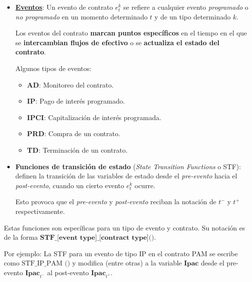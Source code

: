 \documentclass{beamer}
\begin{document}
\begin{frame}
    \begin{itemize}
        \item \textbf{\underline{Eventos}}: Un evento de contrato $e_t^k$ se refiere a cualquier evento \textit{programado} o \textit{no programado} en un momento determinado $t$ y de un tipo determinado $k$. 
        \vfill

        Los eventos del contrato \textbf{marcan puntos específicos} en el tiempo en el que se \textbf{intercambian flujos de efectivo} o se \textbf{actualiza el estado del contrato}. 

        \vfill
        \pause

        Algunos tipos de eventos:

        \begin{itemize}
            \item \textbf{AD}: Monitoreo del contrato.
            \item \textbf{IP}: Pago de interés programado.
            \item \textbf{IPCI}: Capitalización de interés programada.
            \item \textbf{PRD}: Compra de un contrato.
            \item \textbf{TD}: Terminación de un contrato.

        \end{itemize}
    \end{itemize}
\end{frame}

\begin{frame}
    \begin{itemize}
        \item \textbf{Funciones de transición de estado} (\textit{State Transition Functions} o STF): definen la transición de las variables de estado desde el \textit{pre-evento} hacia el \textit{post-evento}, cuando un cierto evento $e^k_t$ ocurre. 

            Esto provoca que el \textit{pre-evento} y \textit{post-evento} reciban la notación de $t^-$ y $t^+$ respectivamente.

  \end{itemize}
  \pause
  \vfill
  Estas funciones son específicas para un tipo de evento y contrato. Su notación es de la forma $\textbf{STF\_[event type]\_[contract type]()}$.
  \vfill
  \pause

  Por ejemplo: La STF para un evento de tipo IP en el contrato PAM se escribe como $\text{STF\_IP\_PAM ()}$ y modifica (entre otras) a la variable $\textbf{Ipac}$ desde el pre-evento $\textbf{Ipac}_{t^-}$ al post-evento $\textbf{Ipac}_{t^+}$.

\end{frame}
\end{document}
